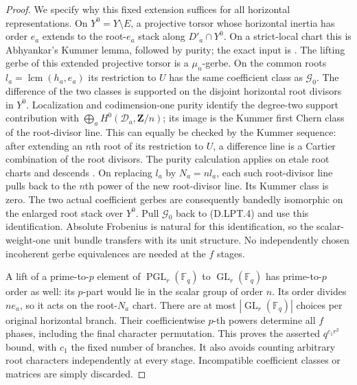 \begin{proof}
We specify why this fixed extension suffices for all horizontal
representations. On $Y^0=Y\setminus E$, a projective torsor whose
horizontal inertia has order $e_a$ extends to the root-$e_a$
stack along $D'_a\cap Y^0$. On a strict-local chart this is
Abhyankar's Kummer lemma, followed by purity; the exact input is
\citep[Expose~XIII, Propositions~5.1--5.2 and Corollary~5.3, pp.~428--430]{C_SGA1}.
The lifting gerbe of this extended projective torsor is a
$\mu_n$-gerbe. On the common roots
$l_a=\operatorname{lcm}(h_a,e_a)$ its restriction to $U$ has the
same coefficient class as $\mathcal G_0$.
The difference of the two classes is supported on the disjoint
horizontal root divisors in $Y^0$. Localization and codimension-one
purity identify the degree-two support contribution with
$\bigoplus_a H^0(\mathcal D_a,\mathbf Z/n)$; its image is the
Kummer first Chern class of the root-divisor line.
This can equally be checked by the Kummer sequence: after extending
an $n$th root of its restriction to $U$, a difference line is a
Cartier combination of the root divisors. The purity calculation
applies on etale root charts and descends
\citep[Expose~XVI, Theorem~3.1.1 and the normal-crossings
Corollary~3.1.3]{A_ILO2014}.
On replacing $l_a$ by $N_a=nl_a$, each such root-divisor line pulls
back to the $n$th power of the new root-divisor line. Its Kummer
class is zero. The two actual coefficient gerbes are consequently
bandedly isomorphic on the enlarged root stack over $Y^0$.
Pull $\mathcal G_0$ back to (D.LPT.4) and use this identification.
Absolute Frobenius is natural for this identification, so the
scalar-weight-one unit bundle transfers with its unit structure.
No independently chosen incoherent gerbe equivalences are needed
at the $f$ stages.

A lift of a prime-to-$p$ element of $\operatorname{PGL}_r(\mathbb F_q)$
to $\operatorname{GL}_r(\mathbb F_q)$ has prime-to-$p$ order as
well: its $p$-part would lie in the scalar group of order $n$.
Its order divides $ne_a$, so it acts on the root-$N_a$ chart.
There are at most $|\operatorname{GL}_r(\mathbb F_q)|$ choices
per original horizontal branch. Their coefficientwise $p$-th
powers determine all $f$ phases, including the final character
permutation. This proves the asserted $q^{c_1r^2}$ bound, with
$c_1$ the fixed number of branches. It also avoids counting
arbitrary root characters independently at every stage.
Incompatible coefficient classes or matrices are simply discarded.
\end{proof}


